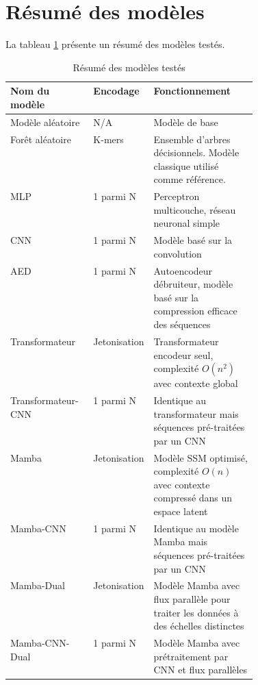 \section{Résumé des modèles}
La tableau \ref{tableau:methodes-resume} présente un résumé des modèles testés.

\begin{table}[hbt!]
    \centering
    \begin{tabular}{llp{0.42\linewidth}}
\hline
Nom du modèle & Encodage & Fonctionnement \\
\hline
Modèle aléatoire & N/A & Modèle de base \\
Forêt aléatoire & K-mers & Ensemble d'arbres décisionnels. Modèle classique utilisé comme référence. \\
MLP & 1 parmi N & Perceptron multicouche, réseau neuronal simple \\
CNN & 1 parmi N & Modèle basé sur la convolution \\
AED & 1 parmi N & Autoencodeur débruiteur, modèle basé sur la compression efficace des séquences \\
Transformateur & Jetonisation & Transformateur encodeur seul, complexité $O(n^2)$ avec contexte global \\
Transformateur-CNN & 1 parmi N & Identique au transformateur mais séquences pré-traitées par un CNN \\
Mamba & Jetonisation & Modèle SSM optimisé, complexité $O(n)$ avec contexte compressé dans un espace latent \\
Mamba-CNN & 1 parmi N & Identique au modèle Mamba mais séquences pré-traitées par un CNN \\
Mamba-Dual & Jetonisation & Modèle Mamba avec flux parallèle pour traiter les données à des échelles distinctes \\
Mamba-CNN-Dual & 1 parmi N & Modèle Mamba avec prétraitement par CNN et flux parallèles \\
\hline
    \end{tabular}
    \caption{Résumé des modèles testés}
    \label{tableau:methodes-resume}
\end{table}
